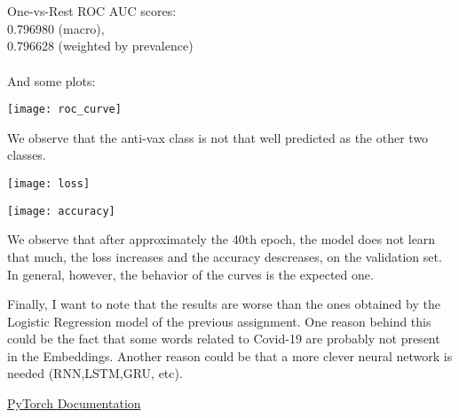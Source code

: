 \documentclass{article}
\begin{document}
\\ \\
One-vs-Rest ROC AUC scores: \\
0.796980 (macro), \\
0.796628 (weighted by prevalence) \\ \\
And some plots:
\begin{center}
\texttt{[image: roc\_curve]}
\end{center}
We observe that the anti-vax class is not that well predicted as the other two classes.
\begin{center}
\texttt{[image: loss]}
\end{center}
\begin{center}
\texttt{[image: accuracy]}
\end{center}
We observe that after approximately the 40th epoch, the model does not learn that much, the loss increases and the accuracy descreases, on the validation set.
In general, however, the behavior of the curves is the expected one.

Finally, I want to note that the results are worse than the ones obtained by the Logistic Regression model of the previous assignment. One reason behind this could be the fact that some words related to Covid-19 are probably not present in the Embeddings. Another reason could be that a more clever neural network is needed (RNN,LSTM,GRU, etc).






\begin{thebibliography}{9}
\bibitem{}
\href{https://pytorch.org/docs/stable/nn.html#non-linear-activations-other}{PyTorch Documentation}

\end{thebibliography}
\end{document}
